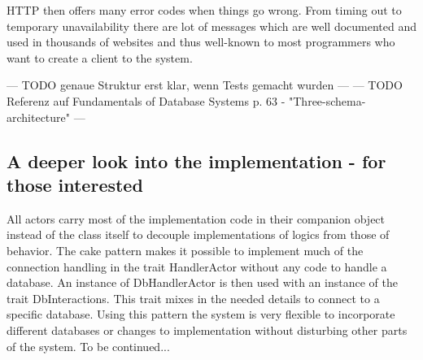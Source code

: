 \documentclass[twoside, 11pt]{scrartcl}
\begin{document}
HTTP then offers many error codes when things go wrong. From timing out to temporary unavailability there are lot of messages which are well documented and used in thousands of websites and thus well-known to most programmers who want to create a client to the system.

--- TODO  genaue Struktur erst klar, wenn Tests gemacht wurden ---
--- TODO Referenz auf Fundamentals of Database Systems p. 63 - "Three-schema-architecture" ---



\subsection{A deeper look into the implementation - for those interested}
All actors carry most of the implementation code in their companion object instead of the class itself to decouple implementations of logics from those of behavior. The cake pattern \cite{link:cakePattern} makes it possible to implement much of the connection handling in the trait HandlerActor without any code to handle a database.  An instance of DbHandlerActor is then used with an instance of the trait DbInteractions. This trait mixes in the needed details to connect to a specific database. Using this pattern the system is very flexible to incorporate different databases or changes to implementation without disturbing other parts of the system. To be continued...
\end{document}
